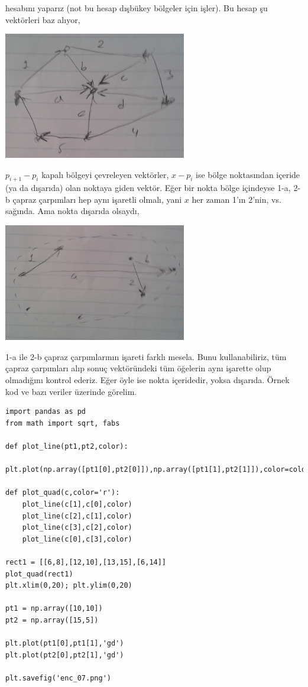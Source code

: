 \documentclass[12pt,fleqn]{article}\usepackage{../../common}
\begin{document}
hesabını yaparız (not bu hesap dışbükey bölgeler için işler). Bu hesap şu
vektörleri baz alıyor,

\includegraphics[width=8cm]{enc_04.png}

$p_{i+1}-p_i$  kapalı bölgeyi çevreleyen vektörler, $x-p_i$ ise bölge
noktasından içeride (ya da dışarıda) olan noktaya giden vektör. Eğer bir nokta
bölge içindeyse 1-a, 2-b çapraz çarpımları hep aynı işaretli olmalı, yani $x$
her zaman 1'ın 2'nin, vs. sağında. Ama nokta dışarıda olsaydı,

\includegraphics[width=8cm]{enc_06.png}

1-a ile 2-b çapraz çarpımlarının işareti farklı mesela. Bunu kullanabiliriz, tüm
çapraz çarpımları alıp sonuç vektöründeki tüm öğelerin aynı işarette olup
olmadığını kontrol ederiz. Eğer öyle ise nokta içeridedir, yoksa dışarıda. Örnek
kod ve bazı veriler üzerinde görelim. 

\begin{verbatim}
import pandas as pd
from math import sqrt, fabs

def plot_line(pt1,pt2,color):
    plt.plot(np.array([pt1[0],pt2[0]]),np.array([pt1[1],pt2[1]]),color=color)
    
def plot_quad(c,color='r'):
    plot_line(c[1],c[0],color)
    plot_line(c[2],c[1],color)
    plot_line(c[3],c[2],color)
    plot_line(c[0],c[3],color)

rect1 = [[6,8],[12,10],[13,15],[6,14]]
plot_quad(rect1)
plt.xlim(0,20); plt.ylim(0,20)

pt1 = np.array([10,10])
pt2 = np.array([15,5])

plt.plot(pt1[0],pt1[1],'gd')
plt.plot(pt2[0],pt2[1],'gd')

plt.savefig('enc_07.png')
\end{verbatim}
\end{document}
